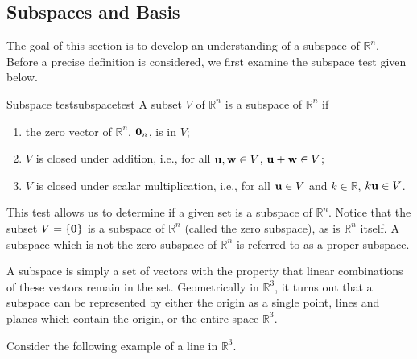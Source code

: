 \subsection{Subspaces and Basis}

The goal of this section is to develop an understanding of a subspace of $\mathbb{R}^n$. Before a precise definition is considered, we first examine the subspace test given below.

\begin{theorem}{Subspace test}{subspacetest}
A subset $V$ of $\mathbb{R}^n$ is a subspace of $\mathbb{R}^n$ if 
\begin{enumerate}
\item the zero vector of $\mathbb{R}^n$, ${\bf 0}_n$, is in $V$;
\item $V$ is closed under addition, i.e., for all ${\bf u},{\bf w}\in V$, ${\bf u}+{\bf w}\in V$;
\item $V$ is closed under scalar multiplication, i.e., for all ${\bf u}\in V$
and $k\in\mathbb{R}$, $k{\bf u}\in V$.
\end{enumerate}
\end{theorem}

This test allows us to determine if a given set is a subspace of $\mathbb{R}^n$. Notice that the subset $V = \left\{ {\bf 0} \right\}$ is a subspace of $\mathbb{R}^n$ (called the zero subspace), as is $\mathbb{R}^n$ itself. A subspace which is not the zero subspace of $\mathbb{R}^n$ is referred to as a proper subspace.

 A subspace is simply a set of vectors with the property that linear
combinations of these vectors remain in the set. Geometrically in
$\mathbb{R}^{3}$, it turns out that a subspace can be represented by
either the origin as a single point, lines and planes which contain
the origin, or the entire space $\mathbb{R}^{3}$. 

Consider the following example of a line in $\mathbb{R}^3$. 

